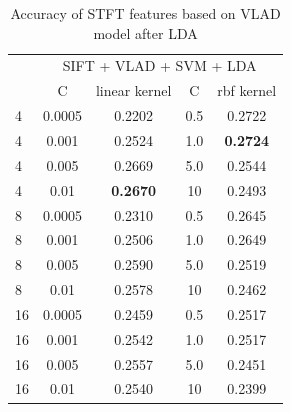 \documentclass[conference]{IEEEtran}
\begin{document}
\begin{table}[htbp]
	\centering
	\newcommand{\tabincell}[2]{\begin{tabular}{@{}#1@{}}#2\end{tabular}}
	\renewcommand\arraystretch{1.0}
	\caption{Accuracy of STFT features based on VLAD model after LDA}
	\label{base2}%
	\begin{tabular}{@{}p{1cm}<{\centering}|c|c|c|c}
		\hline
		\multirow{2}{*}{\diagbox[height=2\line,width=1.42cm,font=\tiny]{$k$}{Acc.}{$\mathit{M}$}} &
		\multicolumn{4}{c}{SIFT + VLAD + SVM + LDA}\\
		\cline{2-5}
		& {C} & {linear kernel} & {C} & {rbf kernel}\\
		\hline
		4   & 0.0005  & 0.2202 & 0.5 & 0.2722\\
		4   & 0.001  & 0.2524 & 1.0 & \textbf{0.2724}\\
		4   & 0.005  & 0.2669 & 5.0 & 0.2544\\
		4   & 0.01  & \textbf{0.2670} & 10 & 0.2493\\
		8   & 0.0005 &0.2310 & 0.5 & 0.2645\\
		8   & 0.001 & 0.2506 & 1.0 & 0.2649\\
		8   & 0.005 & 0.2590 & 5.0 & 0.2519\\
		8   & 0.01  & 0.2578 & 10 & 0.2462\\
		16   & 0.0005  & 0.2459 & 0.5 & 0.2517\\
		16   & 0.001  & 0.2542 & 1.0 & 0.2517\\
		16   & 0.005  & 0.2557 & 5.0 & 0.2451\\
		16   & 0.01  & 0.2540 & 10 & 0.2399\\
		\hline
	\end{tabular}
\end{table}
\end{document}
